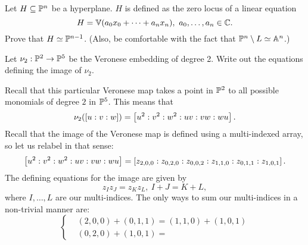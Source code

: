 \documentclass[12pt]{memoir}
\begin{document}
\begin{Ej}
 Let $H\subseteq\mathbb{P}^n$ be a hyperplane. $H$ is defined as the zero locus of a linear equation 
 $$H=\bV(a_0x_0+\dots+a_nx_n),\ a_0,\dots,a_n\in\bC.$$
 Prove that $H\simeq\mathbb{P}^{n-1}$. (Also, be comfortable with the fact that $\mathbb{P}^n\setminus L\simeq\mathbb{A}^n$.) 
\end{Ej}

\begin{ptcbr}
    
  \end{ptcbr}

\begin{Ej}
  Let $\nu_2:\mathbb{P}^2\to\mathbb{P}^5$ be the Veronese embedding of degree 2. Write out the equations defining the image of $\nu_2$.
\end{Ej}

\begin{ptcbr}
  Recall that this particular Veronese map takes a point in $\mathbb{P}^2$ to all possible monomials of degree $2$ in $\mathbb{P}^5$. This means that 
  $$\nu_2(\left\lbrack u:v:w\right\rbrack)=\left\lbrack u^2:v^2:w^2:uv:vw:wu\right\rbrack.$$
  Recall that the image of the Veronese map is defined using a multi-indexed array, so let us relabel in that sense:
  $$\left\lbrack u^2:v^2:w^2:uv:vw:wu\right\rbrack=\left\lbrack z_{2,0,0}:z_{0,2,0}:z_{0,0,2}:z_{1,1,0}:z_{0,1,1}:z_{1,0,1}\right\rbrack.$$
  The defining equations for the image are given by 
  $$z_Iz_J=z_Kz_L,\ I+J=K+L,$$
  where $I,\dots,L$ are our multi-indices. The only ways to sum our multi-indices in a non-trivial manner are:
  $$
  \left\lbrace
  \begin{aligned}
    &(2,0,0)+(0,1,1)=(1,1,0)+(1,0,1)\\
    &(0,2,0)+(1,0,1)=
  \end{aligned}
  \right.
  $$
\end{ptcbr}
\end{document}
